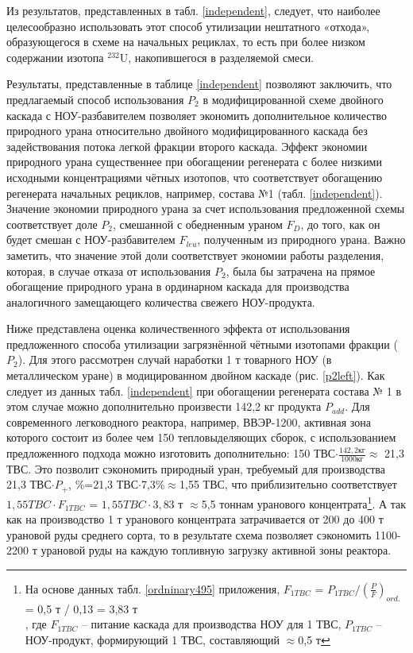 Из результатов, представленных в табл. \ref{independent}, следует, что наиболее целесообразно использовать этот способ утилизации нештатного «отхода», образующегося в схеме на начальных рециклах, то есть при более низком содержании изотопа $^{232}$U, накопившегося в разделяемой смеси. 

Результаты, представленные в таблице \ref{independent} позволяют заключить, что предлагаемый способ использования $P_2$ в модифицированной схеме двойного каскада с НОУ-разбавителем позволяет экономить дополнительное количество природного урана относительно двойного модифицированного каскада без задействования потока легкой фракции второго каскада. Эффект экономии природного урана существеннее при обогащении регенерата с более низкими исходными концентрациями чётных изотопов, что соответствует обогащению регенерата начальных рециклов, например, состава №1 (табл. \ref{independent}). Значение экономии природного урана за счет использования предложенной схемы соответствует доле $P_2$, смешанной с обедненным ураном $F_D$, до того, как он будет смешан с НОУ-разбавителем $F_{leu}$, полученным из природного урана. Важно заметить, что значение этой доли соответствует экономии работы разделения, которая, в случае отказа от использования $P_2$, была бы затрачена на прямое обогащение природного урана в ординарном каскада для производства аналогичного замещающего количества свежего НОУ-продукта.

Ниже представлена оценка количественного эффекта от использования предложенного способа утилизации загрязнённой чётными изотопами фракции ($P_2$). Для этого рассмотрен случай наработки 1 т товарного НОУ (в металлическом уране) в модицированном двойном каскаде (рис. \ref{p2left}). Как следует из данных табл. \ref{independent} при обогащении регенерата состава № 1 в этом случае можно дополнительно произвести 142,2 кг продукта $P_{add}$. Для современного легководного реактора, например, ВВЭР-1200, активная зона которого состоит из более чем 150 тепловыделяющих сборок, с использованием предложенного подхода можно изготовить дополнительно: 150 ТВС$\cdot \frac{142,2 \textit{кг}}{1000 \textit{кг}}\approx$ 21,3 ТВС. Это позволит сэкономить природный уран, требуемый для производства 21,3 ТВС$\cdot P_{+}$, \%=21,3 ТВС$\cdot$7,3\%$\approx$1,55 ТВС, что приблизительно соответствует $1,55 TBC \cdot F_{1 TBC}$ = $1,55 TBC\cdot 3,83$ т $\approx$5,5 тоннам уранового концентрата\footnote{На основе данных табл. \ref{ordninary495} приложения, $F_{1 TBC}$ = $P_{1 TBC}/(\frac{P}{F})_{ord.}$ = 0,5 т / 0,13 = 3,83 т \\ , где $F_{1 TBC}$ -- питание каскада для производства НОУ для 1 ТВС, $P_{1 TBC}$ -- НОУ-продукт, формирующий 1 ТВС, составляющий $\approx$0,5 т}. А так как на производство 1 т уранового концентрата затрачивается от 200 до 400 т урановой руды \cite{bekmanYaDERNAYaFIZIKA} среднего сорта, то в результате схема позволяет сэкономить 1100-2200 т урановой руды на каждую топливную загрузку активной зоны реактора.

